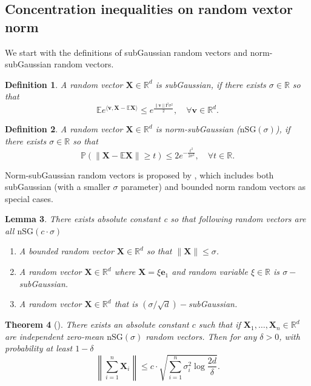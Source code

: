 \documentclass[12pt]{article}
\numberwithin{equation}{section}
\newtheorem{theorem}{Theorem}[section]
\newtheorem{lemma}[theorem]{Lemma}
\newtheorem{definition}[theorem]{Definition}
\begin{document}
\subsection{Concentration inequalities on random vextor norm}
We start with the definitions of subGaussian random vectors and norm-subGaussian random vectors.
\begin{definition}
	A random vector $\boldsymbol{X}\in \mathbb{R}^d$ is subGaussian, if there exists $\sigma\in \mathbb{R}$ so that
	\begin{equation}
	\mathbb{E} e^{\langle\mathbf{v}, \mathbf{X}-\mathbb{E} \mathbf{X}\rangle} \leq e^{\frac{\|\mathbf{v}\| \mathbf{l}^{2} \sigma^{2}}{2}}, \quad \forall \mathbf{v} \in \mathbb{R}^{d}.
	\end{equation}
\end{definition}
\begin{definition}
	A random vector $\boldsymbol{X}\in \mathbb{R}^d$ is norm-subGaussian ($\mathrm{nSG}(\sigma)$), if there exists $\sigma\in \mathbb{R}$ so that
	\begin{equation}
	\mathbb{P}(\|\mathbf{X}-\mathbb{E} \mathbf{X}\| \geq t) \leq 2 e^{-\frac{t^{2}}{2 \sigma^{2}}}, \quad \forall t \in \mathbb{R}.
	\end{equation}
\end{definition}
Norm-subGaussian random vectors is proposed by \citet{jin2019short}, which includes both subGaussian (with a smaller $\sigma$ parameter) and bounded norm random vectors as special cases.
\begin{lemma}
	There exists absolute constant c so that following random vectors are all $\mathrm{nSG}(c\cdot \sigma)$
	\begin{enumerate}
		\item A bounded random vector $\mathbf{X} \in \mathbb{R}^{d}$ so that $\|\mathbf{X}\| \leq \sigma$.
		\item A random vector $\mathbf{X} \in \mathbb{R}^{d}$ where $\mathbf{X}=\xi \mathbf{e}_{1}$ and random variable $\xi \in \mathbb{R}$ is $\sigma-$subGaussian. 
		\item A random vector $\mathbf{X} \in \mathbb{R}^{d}$ that is $(\sigma / \sqrt{d})-$subGaussian.
	\end{enumerate}
\end{lemma}
\begin{theorem}[\citet{jin2019short}]\label{theorem1.9}
	There exists an absolute constant $c$ such that if $\mathbf{X}_{1}, \ldots, \mathbf{X}_{n} \in \mathbb{R}^{d}$ are independent zero-mean $\mathrm{nSG}(\sigma)$ random vectors. Then for any $\delta > 0$, with probability at least $1-\delta$
	\begin{equation}
	\left\|\sum_{i=1}^{n} \mathbf{X}_{i}\right\| \leq c \cdot \sqrt{\sum_{i=1}^{n} \sigma_{i}^{2} \log \frac{2 d}{\delta}}.
	\end{equation}
\end{theorem}
\end{document}

